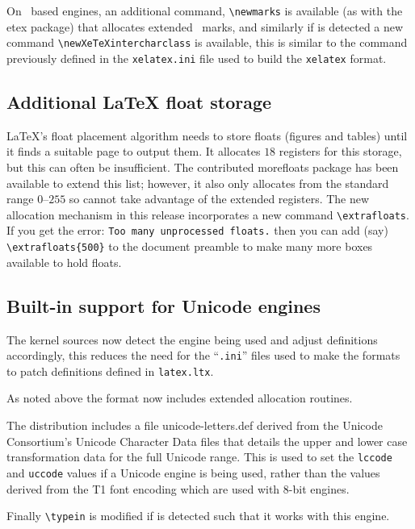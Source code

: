 \documentclass{ltnews}
\begin{document}
On \eTeX\ based engines, an additional command, \verb|\newmarks| is available
(as with the \textsf{etex} package) that allocates extended \eTeX\ marks, and
similarly if  is detected a new command
\verb|\newXeTeXintercharclass| is available, this is similar to the command
previously defined in the \texttt{xelatex.ini} file used to build the
\texttt{xelatex} format.

\subsection{Additional \LaTeX{} float storage}

\LaTeX's float placement algorithm needs to store floats (figures and tables)
until it finds a suitable page to output them. It allocates $18$ registers for
this storage, but this can often be insufficient.
 The contributed \textsf{morefloats} package has
been available to extend this list; however, it also only allocates from the
standard range $0$--$255$ so cannot take advantage of the extended registers.
The new allocation mechanism in this release incorporates a new command
\verb|\extrafloats|. If you get the error:
\mbox{\texttt{Too many unprocessed floats.}}
then you can add (say) \verb|\extrafloats{500}| to the document preamble to
make many more boxes available to hold floats. 


\subsection{Built-in support for Unicode engines}

The kernel sources now detect the engine being used and adjust definitions
accordingly, this reduces the need for the ``\texttt{.ini}'' files used to make
the formats to patch definitions defined in \texttt{latex.ltx}.
 
As noted above the format now includes extended allocation routines.

The distribution includes a file \textsf{unicode-letters.def} derived from the
Unicode Consortium's Unicode Character Data files that details the upper and
lower case transformation data for the full Unicode range. This is used to set
the \verb|lccode| and \verb|uccode| values if a Unicode engine is being used,
rather than the values derived from the T1 font encoding which are used with
8-bit engines.

Finally \verb|\typein| is modified if  is detected
such that it works with this engine.
\end{document}
